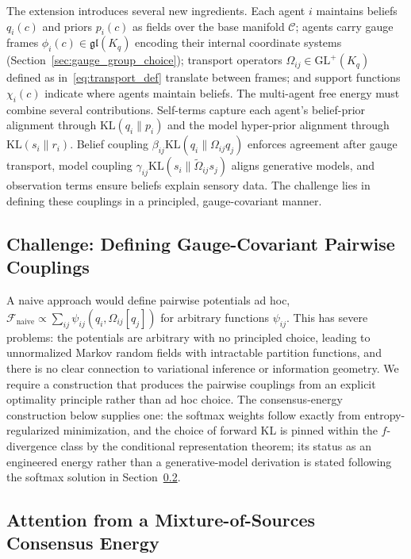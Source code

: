 \documentclass[11pt]{article}
\begin{document}
The extension introduces several new ingredients. Each agent $i$ maintains beliefs $q_i(c)$ and priors $p_i(c)$ as fields over the base manifold $\mathcal{C}$; agents carry gauge frames $\phi_i(c) \in \mathfrak{gl}(K_q)$ encoding their internal coordinate systems (Section~\ref{sec:gauge_group_choice}); transport operators $\Omega_{ij} \in \mathrm{GL}^+(K_q)$ defined as in~\eqref{eq:transport_def} translate between frames; and support functions $\chi_i(c)$ indicate where agents maintain beliefs. The multi-agent free energy must combine several contributions. Self-terms capture each agent's belief-prior alignment through $\mathrm{KL}(q_i \| p_i)$ and the model hyper-prior alignment through $\mathrm{KL}(s_i \| r_i)$. Belief coupling $\beta_{ij}\mathrm{KL}(q_i\|\Omega_{ij}q_j)$ enforces agreement after gauge transport, model coupling $\gamma_{ij}\mathrm{KL}(s_i\|\tilde{\Omega}_{ij}s_j)$ aligns generative models, and observation terms ensure beliefs explain sensory data. The challenge lies in defining these couplings in a principled, gauge-covariant manner.

\subsection{Challenge: Defining Gauge-Covariant Pairwise Couplings}

A naive approach would define pairwise potentials ad hoc, $\mathcal{F}_{\text{naive}} \propto \sum_{ij} \psi_{ij}(q_i, \Omega_{ij}[q_j])$ for arbitrary functions $\psi_{ij}$. This has severe problems: the potentials are arbitrary with no principled choice, leading to unnormalized Markov random fields with intractable partition functions, and there is no clear connection to variational inference or information geometry. We require a construction that produces the pairwise couplings from an explicit optimality principle rather than ad hoc choice. The consensus-energy construction below supplies one: the softmax weights follow exactly from entropy-regularized minimization, and the choice of forward KL is pinned within the $f$-divergence class by the conditional representation theorem; its status as an engineered energy rather than a generative-model derivation is stated following the softmax solution in Section~\ref{sec:mixture_derivation}.

\subsection{Attention from a Mixture-of-Sources Consensus Energy}
\label{sec:mixture_derivation}
\end{document}
